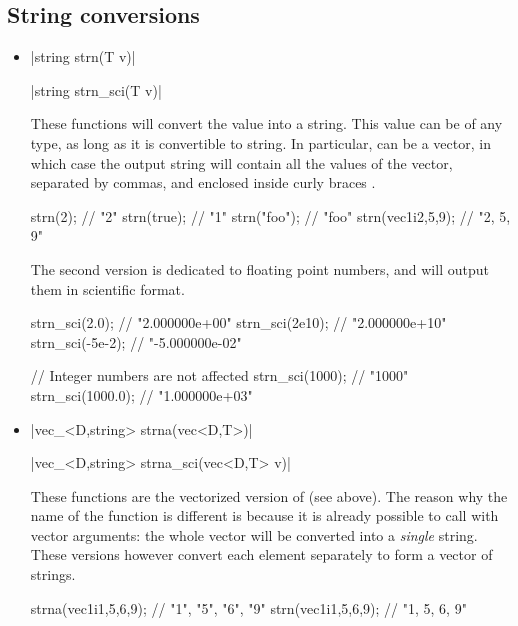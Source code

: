\documentclass[12pt]{report}
\newenvironment{example}
{
    \begin{mdframed}[style=example,frametitle={Example}]
}
{
    \end{mdframed}
}
\begin{document}
\subsection{String conversions \label{SEC:support:string:convert}}

\begin{itemize}
\item \cppinline|string strn(T v)| 

\cppinline|string strn_sci(T v)| 

These functions will convert the value  into a string. This value can be of any type, as long as it is convertible to string. In particular,  can be a vector, in which case the output string will contain all the values of the vector, separated by commas, and enclosed inside curly braces .

\begin{example}
\begin{cppcode}
strn(2);            // "2"
strn(true);         // "1"
strn("foo");        // "foo"
strn(vec1i{2,5,9}); // "{2, 5, 9}"
\end{cppcode}
\end{example}

The second version is dedicated to floating point numbers, and will output them in scientific format.

\begin{example}
\begin{cppcode}
strn_sci(2.0);    // "2.000000e+00"
strn_sci(2e10);   // "2.000000e+10"
strn_sci(-5e-2);  // "-5.000000e-02"

// Integer numbers are not affected
strn_sci(1000);   // "1000"
strn_sci(1000.0); // "1.000000e+03"
\end{cppcode}
\end{example}

\item \cppinline|vec_<D,string> strna(vec<D,T>)| 

\cppinline|vec_<D,string> strna_sci(vec<D,T> v)| 

These functions are the vectorized version of  (see above). The reason why the name of the function is different is because it is already possible to call  with vector arguments: the whole vector will be converted into a \emph{single} string. These versions however convert each element separately to form a vector of strings.

\begin{example}
\begin{cppcode}
strna(vec1i{1,5,6,9}); // {"1", "5", "6", "9"}
strn(vec1i{1,5,6,9});  // "{1, 5, 6, 9}"
\end{cppcode}
\end{example}


\end{itemize}
\end{document}
